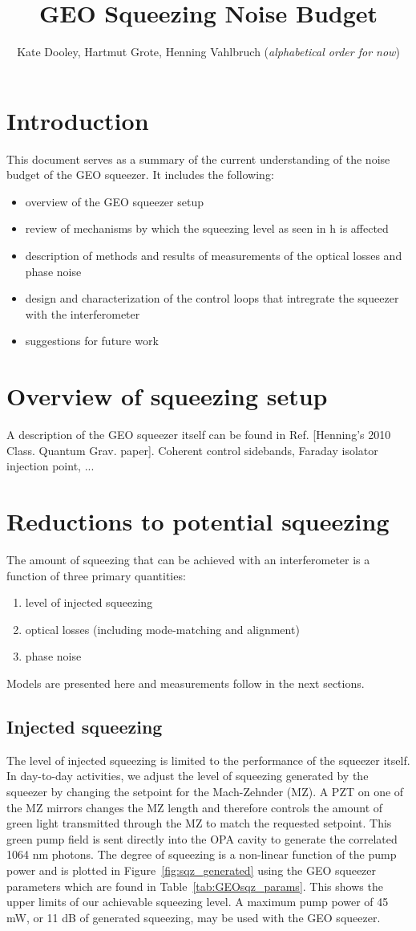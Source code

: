 \documentclass{ligodoc}
\title{GEO Squeezing Noise Budget}
\author{Kate Dooley, Hartmut Grote, Henning Vahlbruch (\emph{alphabetical order for now})}
\begin{document}
\section{Introduction}
This document serves as a summary of the current understanding of the
noise budget of the GEO squeezer. It includes the following:
\begin{itemize}
\item overview of the GEO squeezer setup
\item review of mechanisms by which the squeezing level as seen in h is affected
\item description of methods and results of measurements of the
  optical losses and phase noise
\item design and characterization of the control loops that intregrate
  the squeezer with the interferometer
\item suggestions for future work
\end{itemize}


\section{Overview of squeezing setup}
A description of the GEO squeezer itself can be found in
Ref. [Henning's 2010 Class. Quantum Grav. paper]. Coherent control
sidebands, Faraday isolator injection point, ... 



\section{Reductions to potential squeezing}
The amount of squeezing that can be achieved with an interferometer is
a function of three primary quantities:
\begin{enumerate}
\item level of injected squeezing
\item optical losses (including mode-matching and alignment)
\item phase noise
\end{enumerate}
Models are presented here and measurements follow in the next sections.


\subsection{Injected squeezing}
The level of injected squeezing is limited to the performance of the
squeezer itself. In day-to-day activities, we adjust the level of
squeezing generated by the squeezer by changing the setpoint for the
Mach-Zehnder (MZ). A PZT on one of the MZ mirrors changes the MZ
length and therefore controls the amount of green light transmitted
through the MZ to match the requested setpoint. This green pump field
is sent directly into the OPA cavity to generate the correlated 1064
nm photons. The degree of squeezing is a non-linear function of the
pump power and is plotted in Figure~\ref{fig:sqz_generated} using the
GEO squeezer parameters which are found in
Table~\ref{tab:GEOsqz_params}. This shows the upper limits of our
achievable squeezing level. A maximum pump power of 45 mW, or 11 dB of
generated squeezing, may be used with the GEO squeezer.
\end{document}
